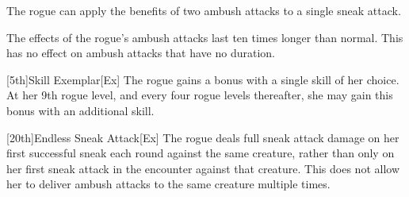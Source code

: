 
The rogue can apply the benefits of two ambush attacks to a single sneak attack.

The effects of the rogue's ambush attacks last ten times longer than normal.
This has no effect on ambush attacks that have no duration.

[5th]{Skill Exemplar}[Ex]
The rogue gains a  bonus with a single skill of her choice.
At her 9th rogue level, and every four rogue levels thereafter, she may gain this bonus with an additional skill.

[20th]{Endless Sneak Attack}[Ex]
The rogue deals full sneak attack damage on her first successful sneak each round against the same creature, rather than only on her first sneak attack in the encounter against that creature.
This does not allow her to deliver ambush attacks to the same creature multiple times.

